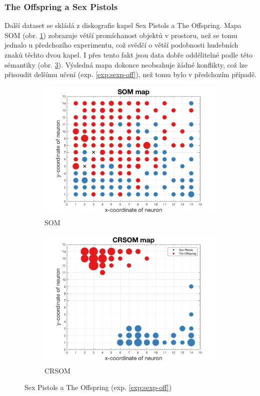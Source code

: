 \documentclass[thesis=M,czech]{FITthesis}[2012/06/26]
\begin{document}
\subsubsection*{The Offspring a Sex Pistols}
Další dataset se skládá z diskografie kapel Sex Pistols a The Offspring. Mapa SOM (obr. \ref{fig:sexp_off_som}) zobrazuje větší promíchanost objektů v prostoru, než se tomu jednalo u  předchozího experimentu, což svědčí o větší podobnosti hudebních znaků těchto dvou kapel. I přes tento fakt jsou data dobře oddělitelné podle této sémantiky (obr. \ref{fig:sexp_off_crsom}). Výsledná mapa dokonce neobsahuje žádné konflikty, což lze přisoudit delšímu učení (exp. \ref{exp:sexp-off}), než tomu bylo v předchozím případě.


\begin{figure}
\centering
\begin{subfigure}{.5\textwidth}
  \centering
  \includegraphics[width=.99\linewidth]{exp_sexp_off_som.png}
  \caption{SOM}
  \label{fig:sexp_off_som}
\end{subfigure}%
\begin{subfigure}{.5\textwidth}
  \centering
  \includegraphics[width=.99\linewidth]{exp_sexp_off_crsom.png}
  \caption{CRSOM}
  \label{fig:sub2}
\end{subfigure}
\caption{Sex Pistols a The Offspring (exp. \ref{exp:sexp-off})}
\label{fig:sexp_off_crsom}
\end{figure}
\end{document}
